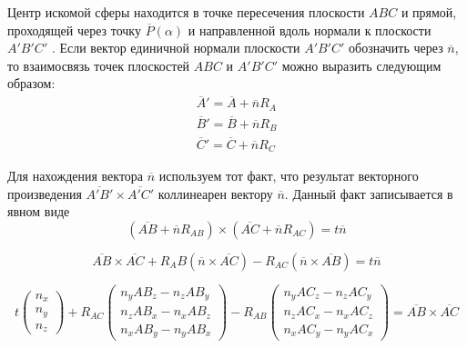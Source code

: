Центр искомой сферы находится в точке пересечения плоскости $ABC$ и прямой, проходящей через точку $\overline{P}(\alpha)$ и направленной вдоль нормали к плоскости $A'B'C'$ .
Если вектор единичной нормали плоскости $A'B'C'$ обозначить через $\overline{n}$, то взаимосвязь точек плоскостей $ABC$ и $A'B'C'$ можно выразить следующим образом:
\begin{equation}
	\begin{aligned}
		\overline{A}' = \overline{A} + \overline{n}R_A \\
		\overline{B}' = \overline{B} + \overline{n}R_B \\
		\overline{C}' = \overline{C} + \overline{n}R_C
	\end{aligned}
\end{equation}

Для нахождения вектора $\overline{n}$ используем тот факт, что результат векторного произведения $\overline{A'B'} \times \overline{A'C'}$ коллинеарен вектору $\overline{n}$.
Данный факт записывается в явном виде
\begin{equation}
	(\overline{AB} + \overline{n} R_{AB}) \times (\overline{AC} + \overline{n} R_{AC}) = t \overline{n}
\end{equation}

\begin{equation}
	\overline{AB} \times \overline{AC} + R_AB(\overline{n} \times \overline{AC}) - R_{AC}(\overline{n} \times \overline{AB}) = t \overline{n}
\end{equation}

\begin{equation}
	t
	\begin{pmatrix}
		n_x \\
		n_y \\
		n_z
	\end{pmatrix}
	+ R_{AC}
	\begin{pmatrix}
		n_y AB_z - n_z AB_y \\
		n_z AB_x - n_x AB_z \\
		n_x AB_y - n_y AB_x
	\end{pmatrix}
	- R_{AB}
	\begin{pmatrix}
		n_y AC_z - n_z AC_y \\
		n_z AC_x - n_x AC_z \\
		n_x AC_y - n_y AC_x
	\end{pmatrix}
	= \overline{AB} \times \overline{AC}
\end{equation}

